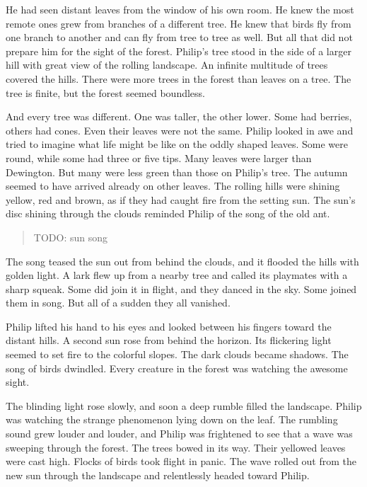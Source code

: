 \documentclass[10pt, draft]{memoir}
\begin{document}
He had seen distant leaves from the window of his own room. He knew the most remote ones grew from branches of a different tree. He knew that birds fly from one branch to another and can fly from tree to tree as well. But all that did not prepare him for the sight of the forest. Philip's tree stood in the side of a larger hill with great view of the rolling landscape. An infinite multitude of trees covered the hills. There were more trees in the forest than leaves on a tree. The tree is finite, but the forest seemed boundless.

And every tree was different. One was taller, the other lower. Some had berries, others had cones. Even their leaves were not the same. Philip looked in awe and tried to imagine what life might be like on the oddly shaped leaves. Some were round, while some had three or five tips. Many leaves were larger than Dewington. But many were less green than those on Philip's tree. The autumn seemed to have arrived already on other leaves. The rolling hills were shining yellow, red and brown, as if they had caught fire from the setting sun. The sun's disc shining through the clouds reminded Philip of the song of the old ant.


\begin{verse}
TODO: sun song
\end{verse}


The song teased the sun out from behind the clouds, and it flooded the hills with golden light. A lark flew up from a nearby tree and called its playmates with a sharp squeak. Some did join it in flight, and they danced in the sky. Some joined them in song. But all of a sudden they all vanished.

Philip lifted his hand to his eyes and looked between his fingers toward the distant hills. A second sun rose from behind the horizon. Its flickering light seemed to set fire to the colorful slopes. The dark clouds became shadows. The song of birds dwindled. Every creature in the forest was watching the awesome sight.

The blinding light rose slowly, and soon a deep rumble filled the landscape. Philip was watching the strange phenomenon lying down on the leaf. The rumbling sound grew louder and louder, and Philip was frightened to see that a wave was sweeping through the forest. The trees bowed in its way. Their yellowed leaves were cast high. Flocks of birds took flight in panic. The wave rolled out from the new sun through the landscape and relentlessly headed toward Philip.
\end{document}
